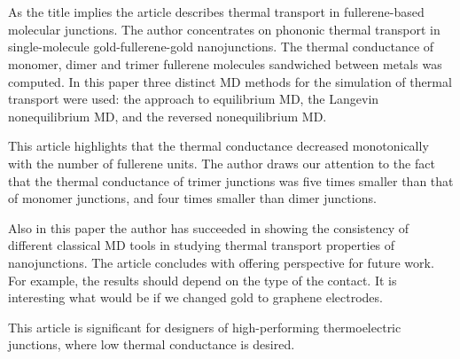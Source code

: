 \documentclass[main.tex]{subfiles}
\begin{document}
\setcounter{secnumdepth}{0}


\setcounter{section}{103}


\setcounter{subsection}{1}

\ \\\\
\newpage


\setcounter{subsection}{2}
As the title implies the article describes thermal transport in fullerene-based molecular junctions.
The author concentrates on phononic thermal transport in single-molecule gold-fullerene-gold nanojunctions.
The thermal conductance of monomer, dimer and trimer fullerene molecules sandwiched between metals was computed.
In this paper three distinct MD methods for the simulation of thermal transport were used: the approach to equilibrium MD, the Langevin nonequilibrium MD, and the reversed nonequilibrium MD.\par
This article highlights that the thermal conductance decreased monotonically with the number of fullerene units.
The author draws our attention to the fact that the thermal conductance of trimer junctions was five times smaller than that of monomer junctions, and four times smaller than dimer junctions.\par
Also in this paper the author has succeeded in showing the consistency of different classical MD tools in studying thermal transport properties of nanojunctions.
The article concludes with offering perspective for future work.
For example, the results should depend on the type of the contact.
It is interesting what would be if we changed gold to graphene electrodes.\par
This article is significant for designers of high-performing thermoelectric junctions, where low thermal conductance is desired.
\ \\\\
\newpage
\end{document}
